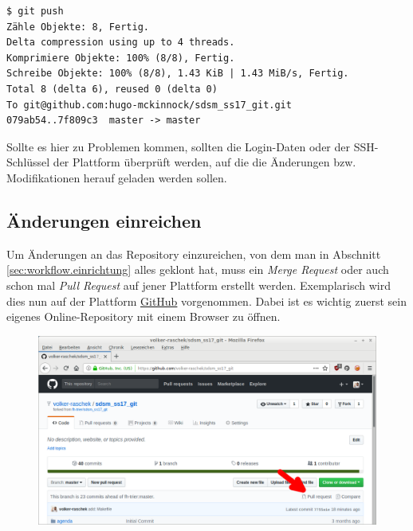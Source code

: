 \begin{verbatim}
$ git push
Zähle Objekte: 8, Fertig.
Delta compression using up to 4 threads.
Komprimiere Objekte: 100% (8/8), Fertig.
Schreibe Objekte: 100% (8/8), 1.43 KiB | 1.43 MiB/s, Fertig.
Total 8 (delta 6), reused 0 (delta 0)
To git@github.com:hugo-mckinnock/sdsm_ss17_git.git
079ab54..7f809c3  master -> master
\end{verbatim}

\begin{INFO}
  Sollte es hier zu Problemen kommen, sollten die Login-Daten oder der SSH-Schlüssel der Plattform überprüft werden, auf die die Änderungen bzw. Modifikationen herauf geladen werden sollen. 
\end{INFO}


\subsection{Änderungen einreichen}
\label{sec:work-with-git.send-merge-request}
Um Änderungen an das Repository einzureichen, von dem man in Abschnitt \ref{sec:workflow.einrichtung} alles geklont hat, muss ein \textit{Merge Request} oder auch schon mal \textit{Pull Request} auf jener Plattform erstellt werden. Exemplarisch wird dies nun auf der Plattform \href{https://github.com}{GitHub} vorgenommen. Dabei ist es wichtig zuerst sein eigenes Online-Repository mit einem Browser zu öffnen.

\begin{landscape}
  \begin{figure}[h]
    \centering
    \includegraphics[width=1\textwidth]{images//pull-request.png}
    \label{img:github-pull-request}
  \end{figure}
\end{landscape}


